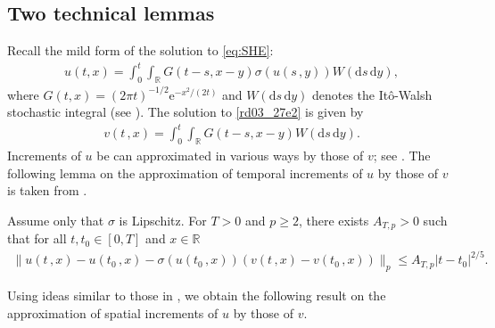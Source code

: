 \documentclass[12pt,a4paper]{article}
\newcommand{\R}{{\mathbb{R}}}
\renewcommand{\d}{\mathrm{d}}
\newcommand{\<}{\langle}
\renewcommand{\>}{\rangle}
\newcommand{\e}{\mathrm{e}}
\begin{document}
 
 
 \subsection{Two technical lemmas}
 Recall the mild form of the solution to \eqref{eq:SHE}:
 \begin{align}\label{rd07_23e1}
 u(t,x)= \int_0^t\int_\R G(t-s, x-y)\sigma(u(s\,,y))W(\d s\, \d y),
 \end{align}
 where $G(t,x)= (2\pi t)^{-1/2}\e^{-x^2/(2t)}$ and $W(\d s\, \d y)$ denotes the It\^o-Walsh stochastic integral (see \cite{spdewalsh,dss}).
 The solution to \eqref{rd03_27e2} is given by
 \begin{align*}
 v(t\,,x) = \int_0^t\int_\R G(t-s, x-y)W(\d s\, \d y).
 \end{align*}
Increments of $u$ be can approximated in various ways by those of $v$; see \cite{KSXZ13,FKM15,HP15}. The following lemma on the approximation of temporal increments of $u$ by those of $v$ is taken from \cite{KSXZ13}.

\begin{lemma}\label{lem:tem} 
{\rm \cite[Theorem 4.1]{KSXZ13}}
Assume only that $\sigma$ is Lipschitz. For $T>0$ and $p\geq2$, there exists $A_{T,p}>0$ such that for all $t, t_0\in[0, T]$ and $x\in \R$
           \begin{align*}
           \|u(t\,,x)-u(t_0\,,x)- \sigma(u(t_0\,,x))(v(t\,,x)-v(t_0\,,x))\|_p \le A_{T,p} |t-t_0|^{2/5}.
           \end{align*}
 \end{lemma}
 
 Using  ideas similar to those in \cite{KSXZ13,FKM15}, we obtain the following result on the approximation of spatial increments of $u$ by those of $v$.
\end{document}

